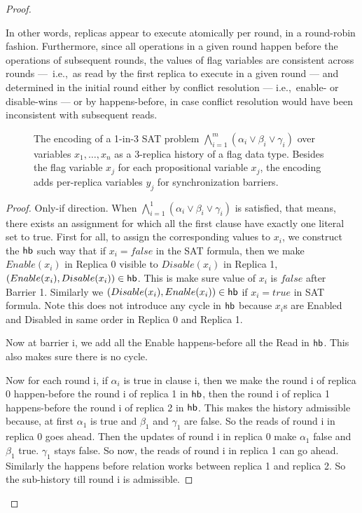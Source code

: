 \begin{proof}
\begin{enumerate}
\vspace{-1.5mm}
  \end{enumerate}

  In other words, replicas appear to execute atomically per round, in a round-robin fashion. Furthermore, since all operations in a given round happen before the operations of subsequent rounds, the values of flag variables are consistent across rounds — i.e.,~as read by the first replica to execute in a given round — and determined in the initial round either by conflict resolution — i.e.,~enable- or disable-wins — or by happens-before, in case conflict resolution would have been inconsistent with subsequent reads.

  \begin{figure}[t]
    \centering
    {\scriptsize}
         \vspace{-1mm}
    \caption{The encoding of a 1-in-3 SAT problem $\bigwedge_{i=1}^{m} (\alpha_i \lor \beta_i \lor \gamma_i)$ over variables $x_1, \ldots, x_n$ as a 3-replica history of a flag data type. Besides the flag variable $x_j$ for each propositional variable $x_j$, the encoding adds per-replica variables $y_j$ for synchronization barriers.}
    \label{fig:3sat-to-flags}
    \vspace{-4mm}
  \end{figure}


  \begin{proof}
    Only-if direction.
    When $\bigwedge_{i=1}^{1} (\alpha_i \lor \beta_i \lor \gamma_i)$ is satisfied, that means, there exists an assignment for which all the first clause have exactly one literal set to true. First for all, to assign the corresponding values to $x_i$, we construct the $\textsf{hb}$ such way that if $x_i = false$ in the SAT formula, then we make $Enable(x_i)$ in Replica 0 visible to $Disable(x_i)$ in Replica 1, \ie $(Enable(x_i), Disable(x_i)) \in \textsf{hb}$. This is make sure value of $x_i$ is $false$ after Barrier 1. Similarly we $(Disable(x_i), Enable(x_i)) \in \textsf{hb}$ if $x_i = true$ in SAT formula. Note this does not introduce any cycle in $\textsf{hb}$ because $x_i$s are \textrm{Enable}d and \textrm{Disable}d in same order in Replica 0 and Replica 1.

    Now at barrier i, we add all the \textrm{Enable} happens-before all the \textrm{Read} in $\textsf{hb}$. This also makes sure there is no cycle.

    Now for each round i, if $\alpha_i$ is true in clause i, then we make the round i of replica 0 happen-before the round i of replica 1 in $\textsf{hb}$, then the round i of replica 1 happens-before the round i of replica 2 in $\textsf{hb}$. This makes the history admissible because, at first $\alpha_1$ is true and $\beta_1$ and $\gamma_1$ are false. So the reads of round i in replica 0 goes ahead. Then the updates of round i in replica 0 make $\alpha_1$ false and $\beta_1$ true. $\gamma_1$ stays false. So now, the reads of round i in replica 1 can go ahead. Similarly the happens before relation works between replica 1 and replica 2. So the sub-history till round i is admissible.
    

\end{proof}
\end{proof}
